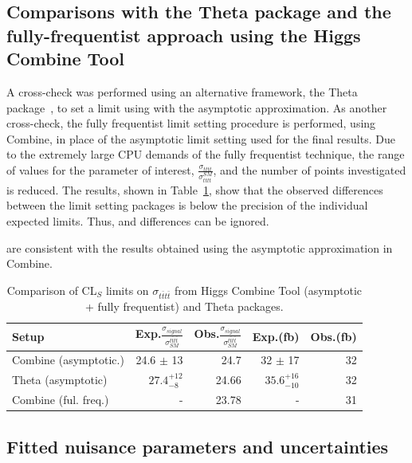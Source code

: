 \subsection{Comparisons with the Theta package and the fully-frequentist approach using the Higgs Combine Tool}

A cross-check was performed using an alternative framework, the Theta package~\cite{theta}, to set a limit using \CLS with the asymptotic approximation. As another cross-check, the fully frequentist \CLS limit setting procedure is performed, using Combine, in place of the asymptotic limit setting used for the final results. Due to the extremely large CPU demands of the fully frequentist technique, the range of values for the parameter of interest, $\frac{\sigma_{tttt}}{\sigma_{tttt}^{SM}}$, and the number of points investigated is reduced. The results, shown in Table~\ref{tab:ThetaFreq}, show that the observed differences between the limit setting packages is below the precision of the individual expected limits. Thus, and differences can be ignored.

are consistent with the results obtained using the asymptotic approximation in Combine.


\begin{table}[ht!]
\centering
\begin{tabular}{|l|r|r|r|r|}
 \hline 
 Setup & Exp.$\frac{\sigma_{signal}}{\sigma_{SM}^{t\bar{t}t\bar{t}}}$ & Obs.$\frac{\sigma_{signal}}{\sigma_{SM}^{t\bar{t}t\bar{t}}}$ & Exp.(fb) &Obs.(fb) \\ 
\hline
{\color{blue}Combine (asymptotic.)} & {\color{blue} 24.6 $\pm$ 13}  & {\color{blue}24.7} & {\color{blue} 32  $\pm$ 17}  & {\color{blue}32} \\
\hline
Theta (asymptotic) & $27.4^{+12}_{-8}$ & 24.66 & $35.6^{+16}_{-10}$ & 32 \\
 \hline
Combine (ful. freq.) &  -  & 23.78 &  -  & 31 \\
\hline
\end{tabular}
\caption{Comparison of CL$_S$ limits on $\sigma_{t\bar{t}t\bar{t}}$ from Higgs Combine Tool (asymptotic + fully frequentist) and Theta packages.}
\label{tab:ThetaFreq}
\end{table}


\subsection{Fitted nuisance parameters and uncertainties}

